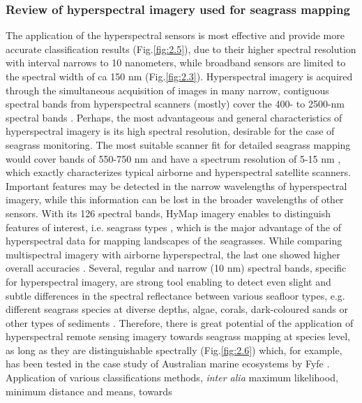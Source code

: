 \documentclass[10pt, a4paper]{article}
\begin{document}
\subsubsection[Review of hyperspectral imagery...]{Review of hyperspectral imagery used for seagrass mapping}\label{sec:2.4.2}
The application of the hyperspectral sensors is most effective and provide more accurate classification
results  (Fig.\ref{fig:2.5}), due to their higher spectral resolution \cite{Bharathi03}\label{Bharathi03} with interval
narrows to 10 nanometers, while broadband sensors are limited to the spectral width of ca
150 nm  (Fig.\ref{fig:2.3}). 
Hyperspectral imagery is acquired through the simultaneous acquisition of images in many
narrow, contiguous spectral bands from hyperspectral scanners (mostly) cover the 400-
to 2500-nm spectral bands \cite{Schmidt03}\label{Schmidt03}.
Perhaps, the most advantageous and general characteristics of hyperspectral imagery is its
high spectral resolution, desirable for the case of seagrass monitoring. 
The most suitable
scanner fit for detailed seagrass mapping would cover bands of 550-750 nm and have a spectrum
resolution of 5-15 nm \cite{Fyfe04}\label{Fyfe04}, which exactly characterizes typical airborne and
hyperspectral satellite scanners. Important features may be detected in the narrow
wavelengths of hyperspectral imagery, while this information can be lost in the broader
wavelengths of other sensors. With its 126 spectral bands, HyMap imagery enables to
distinguish features of interest, i.e. seagrass types \cite{Peneva07}\label{Peneva07}, which is the major
advantage of the of hyperspectral data for mapping landscapes of the seagrasses.
While comparing multispectral imagery with airborne hyperspectral, the last one showed higher
overall accuracies \cite{Phinn08}\label{Phinn08}. Several, regular and narrow (10 nm) spectral bands, specific for
hyperspectral imagery, are strong tool enabling to detect even slight and subtle differences in the
spectral reflectance between various seafloor types, e.g. different seagrass species at diverse depths,
algae, corals, dark-coloured sands or other types of sediments \cite{Hochberg03a}\label{Hochberg03a}. 
Therefore, there is great potential of the application of hyperspectral remote sensing imagery towards seagrass
mapping at species level, as long as they are distinguishable spectrally (Fig.\ref{fig:2.6}) which, for example, has been
tested in the case study of Australian marine ecosystems by Fyfe \cite{Fyfe04}\label{Fyfe04}. 
Application of various classifications methods, \textit{inter alia} maximum likelihood, minimum distance and means, towards
\end{document}
